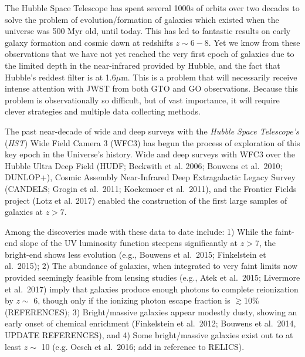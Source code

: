 \documentclass[12pt]{article}
\begin{document}
The Hubble Space Telescope has spent several 1000s of orbits over two decades to solve the problem of evolution/formation of galaxies which existed when the universe was 500 Myr old, until today. This has led to fantastic results on early galaxy formation and cosmic dawn at redshifts $z \sim 6-8$. Yet we know from these observations that we have not yet reached the very first epoch of galaxies due to the limited depth in the near-infrared provided by Hubble, and the fact that Hubble's reddest filter is at 1.6$\mu$m. This is a problem that will necessarily receive intense attention with JWST from both GTO and GO observations.  Because this problem is observationally so difficult, but of vast importance, it will require clever strategies and multiple data collecting methods.

The past near-decade of wide and deep surveys with the {\it Hubble Space Telescope’s} ({\it HST}) Wide Field Camera 3 (WFC3) has begun the process of exploration of this key epoch in the Universe’s history.  Wide and deep surveys with WFC3 over the Hubble Ultra Deep Field (HUDF; Beckwith et al. 2006; Bouwens et al.\ 2010; DUNLOP+), Cosmic Assembly Near-Infrared Deep Extragalactic Legacy Survey (CANDELS; Grogin et al.\ 2011; Koekemoer et al.\ 2011), and the Frontier Fields project (Lotz et al. 2017) enabled the construction of the first large samples of galaxies at $z>7$.  

Among the discoveries made with these data to date include: 1) While the faint-end slope of the UV luminosity function steepens significantly at $z>7$, the bright-end shows less evolution (e.g., Bouwens et al.\ 2015; Finkelstein et al.\ 2015); 2) The abundance of galaxies, when integrated to very faint limits now provided seemingly feasible from lensing studies (e.g., Atek et al.\ 2015; Livermore et al.\ 2017) imply that galaxies produce enough photons to complete reionization by $z\sim$ 6, though only if the ionizing photon escape fraction is $\gtrsim$10\% (REFERENCES); 3) Bright/massive galaxies appear modestly dusty, showing an early onset of chemical enrichment (Finkelstein et al.\ 2012; Bouwens et al.\ 2014, UPDATE REFERENCES), and 4) Some bright/massive galaxies exist out to at least $z \sim$ 10 (e.g. Oesch et al.\ 2016; add in reference to RELICS).
\end{document}
